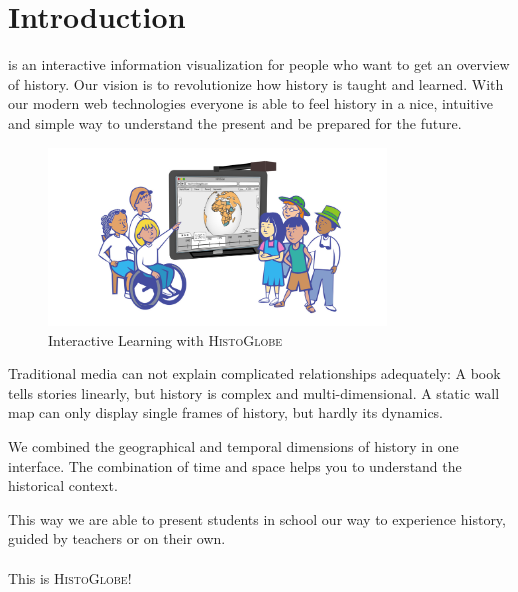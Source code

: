 \section{Introduction} %
\label{sec:introduction}

\HG is an interactive information visualization for people who want to get an overview of history. Our vision is to revolutionize how history is taught and learned. With our modern web technologies everyone is able to feel history in a nice, intuitive and simple way to understand the present and be prepared for the future.

\begin{figure}[H]
  \centering
  \includegraphics[width=0.8\textwidth]{graphics/everybody.jpg}
  \caption{Interactive Learning with \textsc{HistoGlobe}}
  \label{fig:everybody}
\end{figure}

Traditional media can not explain complicated relationships adequately: A book tells stories linearly, but history is complex and multi-dimensional. A static wall map can only display single frames of history, but hardly its dynamics.

We combined the geographical and temporal dimensions of history in one interface. The combination of time and space helps you to understand the historical context.

This way we are able to present students in school our way to experience history, guided by teachers or on their own.
\\
\\
This is \textsc{HistoGlobe}!

